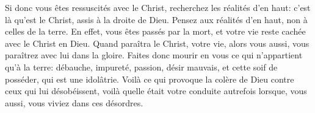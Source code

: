 Si donc vous êtes ressuscités avec le Christ,
	recherchez les réalités d’en haut:
	c’est là qu’est le Christ, assis à la droite de Dieu.
Pensez aux réalités d’en haut, non à celles de la terre.
En effet, vous êtes passés par la mort,
	et votre vie reste cachée avec le Christ en Dieu.
Quand paraîtra le Christ, votre vie,
	alors vous aussi, vous paraîtrez avec lui dans la gloire.
Faites donc mourir en vous ce qui n’appartient qu’à la terre:
	débauche, impureté, passion, désir mauvais,
	et cette soif de posséder, qui est une idolâtrie.
Voilà ce qui provoque la colère de Dieu contre ceux qui lui désobéissent,
	voilà quelle était votre conduite autrefois
	lorsque, vous aussi, vous viviez dans ces désordres.
